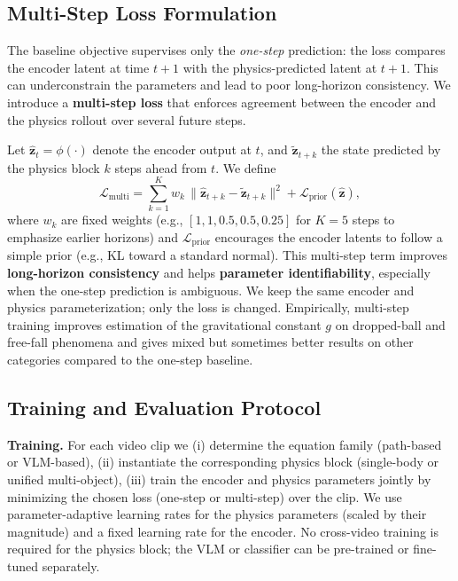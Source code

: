 \subsection{Multi-Step Loss Formulation}
\label{sec:multistep_loss}

The baseline objective supervises only the \emph{one-step} prediction: the loss compares the encoder latent at time $t+1$ with the physics-predicted latent at $t+1$. This can underconstrain the parameters and lead to poor long-horizon consistency. We introduce a \textbf{multi-step loss} that enforces agreement between the encoder and the physics rollout over several future steps.

Let $\hat{\mathbf{z}}_t = \phi(\cdot)$ denote the encoder output at $t$, and $\tilde{\mathbf{z}}_{t+k}$ the state predicted by the physics block $k$ steps ahead from $t$. We define
\begin{equation}
  \mathcal{L}_{\mathrm{multi}} = \sum_{k=1}^{K} w_k \, \bigl\| \hat{\mathbf{z}}_{t+k} - \tilde{\mathbf{z}}_{t+k} \bigr\|^2 + \mathcal{L}_{\mathrm{prior}}(\hat{\mathbf{z}}),
\end{equation}
where $w_k$ are fixed weights (e.g., $[1, 1, 0.5, 0.5, 0.25]$ for $K=5$ steps to emphasize earlier horizons) and $\mathcal{L}_{\mathrm{prior}}$ encourages the encoder latents to follow a simple prior (e.g., KL toward a standard normal). This multi-step term improves \textbf{long-horizon consistency} and helps \textbf{parameter identifiability}, especially when the one-step prediction is ambiguous. We keep the same encoder and physics parameterization; only the loss is changed. Empirically, multi-step training improves estimation of the gravitational constant $g$ on dropped-ball and free-fall phenomena and gives mixed but sometimes better results on other categories compared to the one-step baseline.

\subsection{Training and Evaluation Protocol}
\label{sec:training_eval}

\textbf{Training.} For each video clip we (i) determine the equation family (path-based or VLM-based), (ii) instantiate the corresponding physics block (single-body or unified multi-object), (iii) train the encoder and physics parameters jointly by minimizing the chosen loss (one-step or multi-step) over the clip. We use parameter-adaptive learning rates for the physics parameters (scaled by their magnitude) and a fixed learning rate for the encoder. No cross-video training is required for the physics block; the VLM or classifier can be pre-trained or fine-tuned separately.

